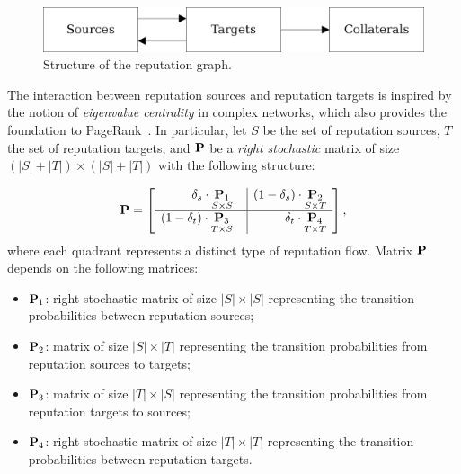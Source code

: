 \documentclass[msc]{ppgccufmg}
\begin{document}
\begin{figure}[h]
   \centerline{\includegraphics[scale=.8]{fig/overview-line}}
   \caption{Structure of the reputation graph.}
   \label{fig:overview}
\end{figure}

The interaction between reputation sources and reputation targets is inspired by the notion of {\em eigenvalue centrality} in complex networks, which also provides the foundation to PageRank~\citep{DBLP:journals/cn/BrinP98}. In particular, let $S$ be the set of reputation sources, $T$ the set of reputation targets, and ${\bf P}$ be a \emph{right stochastic} %
matrix of size $(|S|+|T|) \times (|S|+|T|)$ with the following structure: 

\newcommand{\bkt}[1]{ {^{\langle #1 \rangle}} }

\begin{align}\label{eq:newp}
{\bf P} =
\left[
\begin{array}{r | r}	
	\delta_{s} \cdot \underset{S \times S}{{\bf P}_1} \ \ & (1-\delta_{s}) \cdot \underset{S \times T}{{\bf P}_2} \\ 
	\hline
	(1-\delta_{t}) \cdot \underset{T \times S}{{\bf P}_3} \ \ & \delta_{t} \cdot \underset{T \times T}{{\bf P}_4} \\
\end{array}
\right],
\end{align}
\noindent where each quadrant represents a distinct type of reputation flow. Matrix ${\bf P}$ depends on the following matrices: 

\begin{itemize}
	\item ${\bf P}_1$: right stochastic matrix of size $|S|\times |S|$ representing the transition probabilities between reputation sources;
	\item ${\bf P}_2$: matrix of size $|S|\times |T|$ representing the transition probabilities from reputation sources to targets;
	\item ${\bf P}_3$: matrix of size $|T|\times |S|$ representing the transition probabilities from reputation targets to sources;
	\item ${\bf P}_4$: right stochastic matrix of size $|T|\times |T|$ representing the transition probabilities between reputation targets.
\end{itemize}
\end{document}
